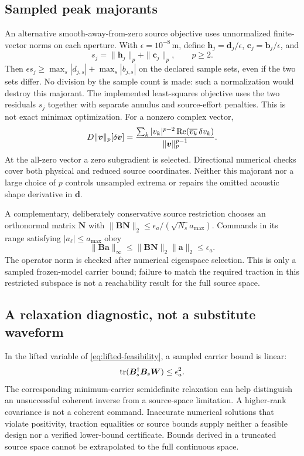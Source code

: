 \subsection{Sampled peak majorants}
An alternative smooth-away-from-zero source objective uses unnormalized
finite-vector norms on each aperture. With $\epsilon=10^{-8}\,\mathrm m$,
define $\bm h_j=\bm d_j/\epsilon$, $\bm c_j=\bm b_j/\epsilon$, and
\begin{equation}
 s_j=\|\bm h_j\|_p+\|\bm c_j\|_p,\qquad p\geq2.
\end{equation}
Then $\epsilon s_j\geq\max_s|d_{j,s}|+\max_s|b_{j,s}|$ on the declared
sample sets, even if the two sets differ. No division by the sample count
is made: such a normalization would destroy this majorant. The implemented
least-squares objective uses the two residuals $s_j$ together with separate
annulus and source-effort penalties. This is not exact minimax optimization.
For a nonzero complex vector,
\begin{equation}
 D\|\bm v\|_p[\delta\bm v]
 =\frac{\sum_k |v_k|^{p-2}\operatorname{Re}(\overline{v_k}\,\delta v_k)}
 {\|\bm v\|_p^{p-1}}.
\end{equation}
At the all-zero vector a zero subgradient is selected. Directional numerical
checks cover both physical and reduced source coordinates. Neither this
majorant nor a large choice of $p$ controls unsampled extrema or repairs
the omitted acoustic shape derivative in $\bm d$.

A complementary, deliberately conservative source restriction chooses an
orthonormal matrix $\bm N$ with
$\|\bm B\bm N\|_2\leq\epsilon_a/(\sqrt{N_s}a_{\max})$.
Commands in its range satisfying $|a_\ell|\leq a_{\max}$ obey
\begin{equation}
 \|\bm B\bm a\|_\infty\leq\|\bm B\bm N\|_2\|\bm a\|_2
 \leq\epsilon_a.
\end{equation}
The operator norm is checked after numerical eigenspace selection.
This is only a sampled frozen-model carrier bound; failure to match the
required traction in this restricted subspace is not a reachability result
for the full source space.

\subsection{A relaxation diagnostic, not a substitute waveform}
In the lifted variable of \cref{eq:lifted-feasibility}, a sampled carrier bound
is linear:
\begin{equation}
 \operatorname{tr}(\bm B_s^\dagger\bm B_s\bm W)\leq\epsilon_a^2.
\end{equation}
The corresponding minimum-carrier semidefinite relaxation can help distinguish
an unsuccessful coherent inverse from a source-space limitation. A higher-rank
covariance is not a coherent command. Inaccurate numerical solutions that
violate positivity, traction equalities or source bounds supply neither a
feasible design nor a verified lower-bound certificate. Bounds derived in a
truncated source space cannot be extrapolated to the full continuous space.

